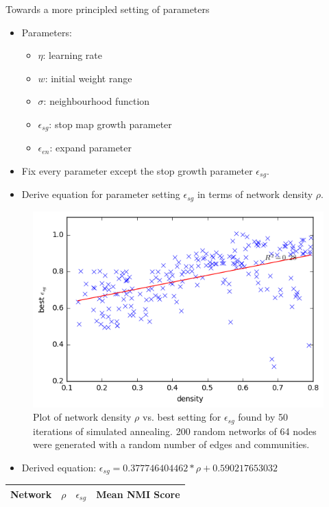 \documentclass{beamer}
\begin{document}
	\begin{frame}[allowframebreaks]{Towards a more principled setting of parameters}
	\begin{itemize}	
	\item Parameters:
	\begin{itemize}	
		\item $\eta$: learning rate
		\item $w$: initial weight range
		\item $\sigma$: neighbourhood function
		\item $\epsilon_{sg}$: stop map growth parameter
		\item $\epsilon_{en}$: expand parameter
	\end{itemize}
	\item Fix every parameter except the stop growth parameter $\epsilon_{sg}$.
	\item Derive equation for parameter setting $\epsilon_{sg}$ in terms of network density $\rho$.
	\end{itemize}
%	
	\begin{figure}
\includegraphics[scale=0.60]{derived_results.png}
\caption{Plot of network density $\rho$ vs. best setting for $\epsilon_{sg}$ found by 50 iterations of simulated annealing. 200 random networks of 64 nodes were generated with a random number of edges and communities.}
\end{figure}
%	
	\begin{itemize}
	\item Derived equation: $\epsilon_{sg} = 0.377746404462 * \rho + 0.590217653032$
	\end{itemize}
	\begin{table}
	\begin{tabular}{c c c c}
	\bottomrule
	\textbf{Network} &     $\rho$  &  $\epsilon_{sg}$ &    \textbf{Mean NMI Score} \\
	\bottomrule


\end{tabular}
\end{table}
\end{frame}
\end{document}
